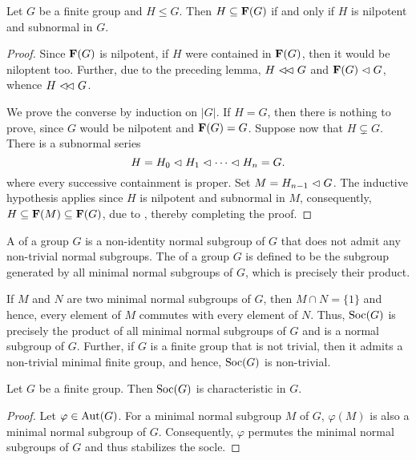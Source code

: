 \begin{proposition}
    Let $G$ be a finite group and $H\le G$. Then $H\subseteq\mathbf{F}(G)$ if and only if $H$ is nilpotent and subnormal in $G$.
\end{proposition}
\begin{proof}
    Since $\mathbf{F}(G)$ is nilpotent, if $H$ were contained in $\mathbf{F}(G)$, then it would be niloptent too. Further, due to the preceding lemma, $H\vartriangleleft\!\vartriangleleft G$ and $\mathbf{F}(G)\vartriangleleft G$, whence $H\vartriangleleft\!\vartriangleleft G$.

    We prove the converse by induction on $|G|$. If $H = G$, then there is nothing to prove, since $G$ would be nilpotent and $\mathbf{F}(G) = G$. Suppose now that $H\subsetneq G$. There is a subnormal series
    \begin{equation*}
        H = H_0\vartriangleleft H_1\vartriangleleft\cdots\vartriangleleft H_n = G.
    \end{equation*}
    where every successive containment is proper. Set $M = H_{n - 1}\vartriangleleft G$. The inductive hypothesis applies since $H$ is nilpotent and subnormal in $M$, consequently, $H\subseteq\mathbf{F}(M)\subseteq\mathbf{F}(G)$, due to , thereby completing the proof.
\end{proof}

\begin{definition}
    A  of a group $G$ is a non-identity normal subgroup of $G$ that does not admit any non-trivial normal subgroups. The  of a  group $G$ is defined to be the subgroup generated by all minimal normal subgroups of $G$, which is precisely their product.
\end{definition}

If $M$ and $N$ are two minimal normal subgroups of $G$, then $M\cap N = \{1\}$ and hence, every element of $M$ commutes with every element of $N$. Thus, $\operatorname{Soc}(G)$ is precisely the product of all minimal normal subgroups of $G$ and is a normal subgroup of $G$. Further, if $G$ is a finite group that is not trivial, then it admits a non-trivial minimal finite group, and hence, $\operatorname{Soc}(G)$ is non-trivial.

\begin{proposition}
    Let $G$ be a finite group. Then $\operatorname{Soc}(G)$ is characteristic in $G$.
\end{proposition}
\begin{proof}
    Let $\varphi\in\operatorname{Aut}(G)$. For a minimal normal subgroup $M$ of $G$, $\varphi(M)$ is also a minimal normal subgroup of $G$. Consequently, $\varphi$ permutes the minimal normal subgroups of $G$ and thus stabilizes the socle.
\end{proof}

